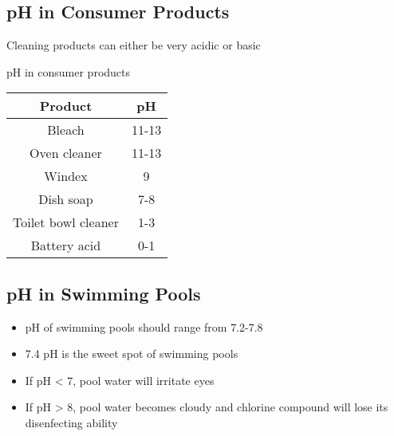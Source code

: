 \documentclass[12pt]{report}
\begin{document}
\subsection{pH in Consumer Products}
Cleaning products can either be very acidic or basic
\begin{table}[h!] %

    \renewcommand{\arraystretch}{1.5} %
    \setlength{\tabcolsep}{10pt} %
    \setlength{\arrayrulewidth}{0.25mm}

    \begin{center}
        pH in consumer products \\
        \vspace{0.5em}
        \begin{tabular}{|c|c|} %
        \hline
        Product & pH \\ %
        \hline
        Bleach & 11-13 \\ %
        \hline
        Oven cleaner & 11-13\\
        \hline
        Windex & 9\\
        \hline 
        Dish soap & 7-8\\
        \hline 
        Toilet bowl cleaner & 1-3\\
        \hline 
        Battery acid & 0-1\\
        \hline
        \end{tabular}
    \end{center}
\end{table} 

\subsection{pH in Swimming Pools}
\begin{itemize}
    \item{pH of swimming pools should range from 7.2-7.8}
    \item{7.4 pH is the sweet spot of swimming pools}
    \item{If pH < 7, pool water will irritate eyes}
    \item{If pH > 8, pool water becomes cloudy and chlorine compound will lose its disenfecting ability}
\end{itemize}
\end{document}
